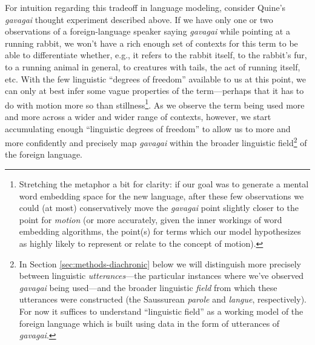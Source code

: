 \documentclass[11pt]{article}
\begin{document}
For intuition regarding this tradeoff in language modeling, consider Quine's \textit{gavagai} thought experiment described above. If we have only one or two observations of a foreign-language speaker saying \textit{gavagai} while pointing at a running rabbit, we won't have a rich enough set of contexts for this term to be able to differentiate whether, e.g., it refers to the rabbit itself, to the rabbit's fur, to a running animal in general, to creatures with tails, the act of running itself, etc. With the few linguistic ``degrees of freedom'' available to us at this point, we can only at best infer some vague properties of the term---perhaps that it has to do with motion more so than stillness\footnote{Stretching the metaphor a bit for clarity: if our goal was to generate a mental word embedding space for the new language, after these few observations we could (at most) conservatively move the \textit{gavagai} point slightly closer to the point for \textit{motion} (or more accurately, given the inner workings of word embedding algorithms, the point(s) for terms which our model hypothesizes as highly likely to represent or relate to the concept of motion).}. As we observe the term being used more and more across a wider and wider range of contexts, however, we start accumulating enough ``linguistic degrees of freedom'' to allow us to more and more confidently and precisely map \textit{gavagai} within the broader linguistic field\footnote{In Section \ref{sec:methods-diachronic} below we will distinguish more precisely between linguistic \textit{utterances}---the particular instances where we've observed \textit{gavagai} being used---and the broader linguistic \textit{field} from which these utterances were constructed (the Saussurean \textit{parole} and \textit{langue}, respectively). For now it suffices to understand ``linguistic field'' as a working model of the foreign language which is built using data in the form of utterances of \textit{gavagai}.} of the foreign language.
\end{document}
